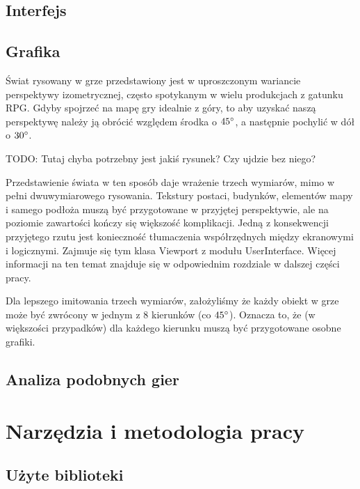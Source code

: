 \documentclass[licencjacka]{pracamgr}
\begin{document}
  
  \section{Interfejs}

  \section{Grafika}
    Świat rysowany w grze przedstawiony jest w uproszczonym wariancie perspektywy izometrycznej, często spotykanym w 
    wielu produkcjach z gatunku RPG. Gdyby spojrzeć na mapę gry idealnie z góry, to aby uzyskać naszą perspektywę należy
    ją obrócić względem środka o $45\degree$, a następnie pochylić w dół o $30\degree$.
    
    TODO: Tutaj chyba potrzebny jest jakiś rysunek? Czy ujdzie bez niego?
    
    Przedstawienie świata w ten sposób daje wrażenie trzech wymiarów, mimo w pełni dwuwymiarowego rysowania. Tekstury
    postaci, budynków, elementów mapy i samego podłoża muszą być przygotowane w przyjętej perspektywie, ale na poziomie
    zawartości kończy się większość komplikacji. Jedną z konsekwencji przyjętego rzutu jest konieczność tłumaczenia
    współrzędnych między ekranowymi i logicznymi. Zajmuje się tym klasa Viewport z modułu UserInterface. Więcej 
    informacji na ten temat znajduje się w odpowiednim rozdziale w dalszej części pracy. 
    
    Dla lepszego imitowania trzech wymiarów, założyliśmy że każdy obiekt w grze może być zwrócony w jednym z 8 kierunków
    (co $45\degree$). Oznacza to, że (w większości przypadków) dla każdego kierunku muszą być przygotowane osobne
    grafiki.
 
  \section{Analiza podobnych gier}

\chapter{Narzędzia i metodologia pracy}
  \section{Użyte biblioteki}
\end{document}
